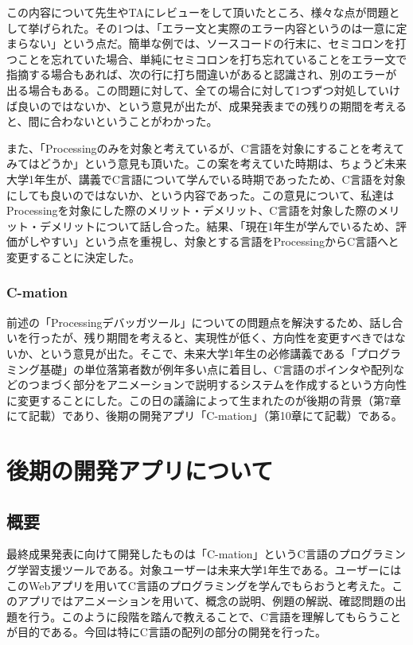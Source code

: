 \documentclass[openany,11pt,papersize]{jsbook}
\begin{document}
\par この内容について先生やTAにレビューをして頂いたところ、様々な点が問題として挙げられた。その1つは、「エラー文と実際のエラー内容というのは一意に定まらない」という点だ。簡単な例では、ソースコードの行末に、セミコロンを打つことを忘れていた場合、単純にセミコロンを打ち忘れていることをエラー文で指摘する場合もあれば、次の行に打ち間違いがあると認識され、別のエラーが出る場合もある。この問題に対して、全ての場合に対して1つずつ対処していけば良いのではないか、という意見が出たが、成果発表までの残りの期間を考えると、間に合わないということがわかった。
 \par また、「Processingのみを対象と考えているが、C言語を対象にすることを考えてみてはどうか」という意見も頂いた。この案を考えていた時期は、ちょうど未来大学1年生が、講義でC言語について学んでいる時期であったため、C言語を対象にしても良いのではないか、という内容であった。この意見について、私達はProcessingを対象にした際のメリット・デメリット、C言語を対象した際のメリット・デメリットについて話し合った。結果、「現在1年生が学んでいるため、評価がしやすい」という点を重視し、対象とする言語をProcessingからC言語へと変更することに決定した。


\subsection{C-mation}
\par 前述の「Processingデバッガツール」についての問題点を解決するため、話し合いを行ったが、残り期間を考えると、実現性が低く、方向性を変更すべきではないか、という意見が出た。そこで、未来大学1年生の必修講義である「プログラミング基礎」の単位落第者数が例年多い点に着目し、C言語のポインタや配列などのつまづく部分をアニメーションで説明するシステムを作成するという方向性に変更することにした。この日の議論によって生まれたのが後期の背景（第7章にて記載）であり、後期の開発アプリ「C-mation」（第10章にて記載）である。


\chapter{後期の開発アプリについて}

\section{概要}
最終成果発表に向けて開発したものは「C-mation」というC言語のプログラミング学習支援ツールである。対象ユーザーは未来大学1年生である。ユーザーにはこのWebアプリを用いてC言語のプログラミングを学んでもらおうと考えた。このアプリではアニメーションを用いて、概念の説明、例題の解説、確認問題の出題を行う。このように段階を踏んで教えることで、C言語を理解してもらうことが目的である。今回は特にC言語の配列の部分の開発を行った。
\end{document}
